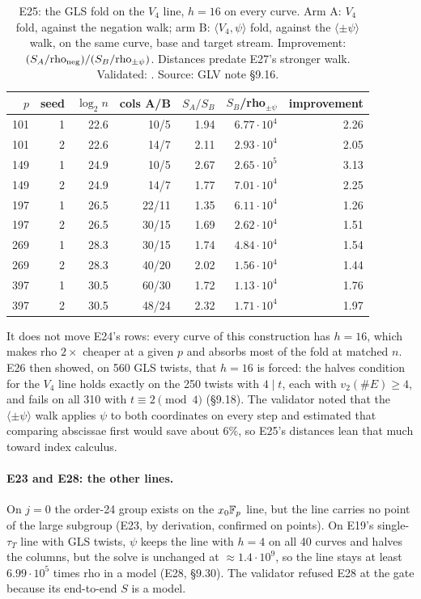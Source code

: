 \begin{table}[t]
\centering\small
\begin{tabular}{@{}rrrrrrr@{}}
\toprule
$p$ & seed & $\log_2n$ & cols A/B & $S_A/S_B$ & $S_B$/rho$_{\pm\psi}$ & improvement \\
\midrule
101 & 1 & 22.6 & 10/5 & 1.94 & $6.77\cdot10^4$ & 2.26 \\
101 & 2 & 22.6 & 14/7 & 2.11 & $2.93\cdot10^4$ & 2.05 \\
149 & 1 & 24.9 & 10/5 & 2.67 & $2.65\cdot10^5$ & 3.13 \\
149 & 2 & 24.9 & 14/7 & 1.77 & $7.01\cdot10^4$ & 2.25 \\
197 & 1 & 26.5 & 22/11 & 1.35 & $6.11\cdot10^4$ & 1.26 \\
197 & 2 & 26.5 & 30/15 & 1.69 & $2.62\cdot10^4$ & 1.51 \\
269 & 1 & 28.3 & 30/15 & 1.74 & $4.84\cdot10^4$ & 1.54 \\
269 & 2 & 28.3 & 40/20 & 2.02 & $1.56\cdot10^4$ & 1.44 \\
397 & 1 & 30.5 & 60/30 & 1.72 & $1.13\cdot10^4$ & 1.76 \\
397 & 2 & 30.5 & 48/24 & 2.32 & $1.71\cdot10^4$ & 1.97 \\
\bottomrule
\end{tabular}
\caption[]{E25: the GLS fold on the $V_4$ line, $h=16$ on every curve. Arm
A: $V_4$ fold, against the negation walk; arm B: $\langle V_4,\psi\rangle$ fold,
against the $\langle\pm\psi\rangle$ walk, on the same curve, base and target
stream. Improvement: $(S_A/\text{rho}_{\rm neg})/(S_B/\text{rho}_{\pm\psi})$.
Distances predate E27's stronger walk. Validated:
. Source: GLV note \S9.16.}
\label{tab:glv-e25}
\end{table} It does not move
E24's rows: every curve of this construction has $h=16$, which makes rho
$2\times$ cheaper at a given $p$ and absorbs most of the fold at matched $n$.
E26 then showed, on 560 GLS twists, that $h=16$ is forced: the halves
condition for the $V_4$ line holds exactly on the 250 twists with $4\mid t$,
each with $v_2(\#E)\ge4$, and fails on all 310 with $t\equiv2\pmod4$ (\S9.18).
The validator noted that the $\langle\pm\psi\rangle$ walk applies $\psi$ to both
coordinates on every step and estimated that comparing abscissae first would
save about $6\%$, so E25's distances lean that much toward index calculus.

\paragraph{E23 and E28: the other lines.} On $j=0$ the order-24 group exists on
the $x_0\mathbb{F}_p$ line, but the line carries no point of the large subgroup (E23,
by derivation, confirmed on points). On E19's single-$\tau_T$ line with GLS
twists, $\psi$ keeps the line with $h=4$ on all 40 curves and halves the
columns, but the solve is unchanged at $\approx1.4\cdot10^9$, so the line stays at
least $6.99\cdot10^5$ times rho in a model (E28, \S9.30). The validator refused E28 at
the gate because its end-to-end $S$ is a model.

